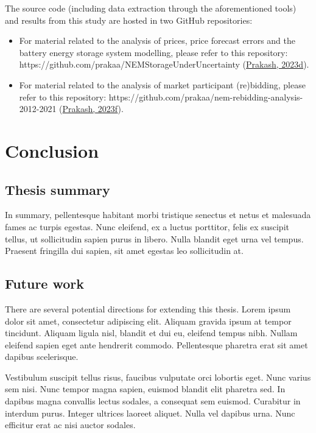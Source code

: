\documentclass[12pt,a4paper,]{report}
\providecommand{\tightlist}{%
  \setlength{\itemsep}{0pt}\setlength{\parskip}{0pt}}
\begin{document}
The source code (including data extraction through the aforementioned
tools) and results from this study are hosted in two GitHub
repositories:

\begin{itemize}
\tightlist
\item
  For material related to the analysis of prices, price forecast errors
  and the battery energy storage system modelling, please refer to this
  repository: https://github.com/prakaa/NEMStorageUnderUncertainty
  (\protect\hyperlink{ref-prakashNEMStorageUnderUncertainty2023}{Prakash,
  2023d}).
\item
  For material related to the analysis of market participant
  (re)bidding, please refer to this repository:
  https://github.com/prakaa/nem-rebidding-analysis-2012-2021
  (\protect\hyperlink{ref-prakashNEMReBidding2023}{Prakash, 2023f}).
\end{itemize}

\hypertarget{sec:conclusion}{%
\chapter{Conclusion}\label{sec:conclusion}}

\hypertarget{thesis-summary}{%
\section{Thesis summary}\label{thesis-summary}}

In summary, pellentesque habitant morbi tristique senectus et netus et
malesuada fames ac turpis egestas. Nunc eleifend, ex a luctus porttitor,
felis ex suscipit tellus, ut sollicitudin sapien purus in libero. Nulla
blandit eget urna vel tempus. Praesent fringilla dui sapien, sit amet
egestas leo sollicitudin at.

\hypertarget{future-work}{%
\section{Future work}\label{future-work}}

There are several potential directions for extending this thesis. Lorem
ipsum dolor sit amet, consectetur adipiscing elit. Aliquam gravida ipsum
at tempor tincidunt. Aliquam ligula nisl, blandit et dui eu, eleifend
tempus nibh. Nullam eleifend sapien eget ante hendrerit commodo.
Pellentesque pharetra erat sit amet dapibus scelerisque.

Vestibulum suscipit tellus risus, faucibus vulputate orci lobortis eget.
Nunc varius sem nisi. Nunc tempor magna sapien, euismod blandit elit
pharetra sed. In dapibus magna convallis lectus sodales, a consequat sem
euismod. Curabitur in interdum purus. Integer ultrices laoreet aliquet.
Nulla vel dapibus urna. Nunc efficitur erat ac nisi auctor sodales.
\end{document}
